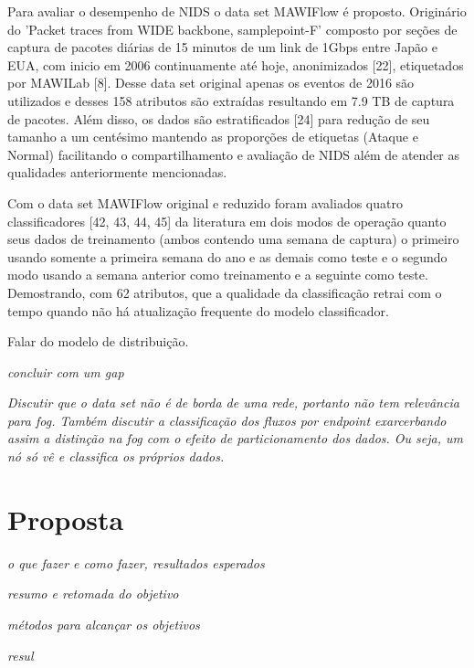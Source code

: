 
Para avaliar o desempenho de NIDS o data set MAWIFlow é proposto. Originário do 
'Packet traces from WIDE backbone, samplepoint-F' composto por seções de captura de pacotes
diárias de 15 minutos de um link de 1Gbps entre Japão e EUA, com inicio em 2006 continuamente até hoje,
anonimizados [22], etiquetados por MAWILab [8].
Desse data set original apenas os eventos de 2016 são utilizados e desses 158 atributos são extraídas
resultando em 7.9 TB de captura de pacotes. Além disso, os dados são estratificados [24] para redução
de seu tamanho a um centésimo mantendo as proporções de etiquetas (Ataque e Normal)
facilitando o compartilhamento e avaliação de NIDS além de atender as qualidades anteriormente mencionadas.

Com o data set MAWIFlow original e reduzido foram avaliados quatro classificadores [42, 43, 44, 45]
da literatura em dois modos de operação quanto seus dados de treinamento
(ambos contendo uma semana de captura) o primeiro usando somente a primeira semana do ano e as demais
como teste e o segundo modo usando a semana anterior como treinamento e a seguinte como teste.
Demostrando, com 62 atributos, que a qualidade da classificação retrai com o tempo quando não há
atualização frequente do modelo classificador.

Falar do modelo de distribuição.

\textit{concluir com um gap}

\textit{Discutir que o data set não é de borda de uma rede, portanto não tem
relevância para fog. Também discutir a classificação dos fluxos por endpoint
exarcerbando assim a distinção na fog com o efeito de particionamento dos dados.
Ou seja, um nó só vê e classifica os próprios dados.}

\chapter{Proposta}
\label{cha:proposta}

\textit{o que fazer e como fazer, resultados esperados}

\textit{resumo e retomada do objetivo}

\textit{métodos para alcançar os objetivos}

\textit{resul}

